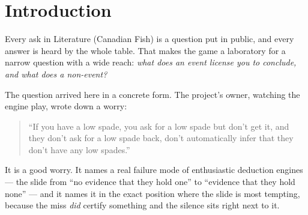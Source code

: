 \documentclass[11pt]{article}
\begin{document}
\begin{abstract}
none is on a difference between arms, and the smaller gap the reading rests on
($0.350$ sets) is under these arms' own $0.42$--$0.47$ detection floor. The arms do share
one bank and one baseline, so the comparison is paired and sharper than a between-bank one
would be --- but the paired interval was not computed, and at this $N$ the ordering is
reported as a signal to re-measure rather than as a settled result. Only a common-baseline
design raises the question at all --- measured each against its own baseline the
calibration fix reads as a flat $+0.04 \pm 0.41$. The same $400$-pair scale is where this instrument is weakest, and the
paper reports that in the body: the defusal quantity measures $+1.62$/$+1.66$ at
$4{,}000$ pairs, and the first explanation offered for the gap was tested and refuted.
A separate observation --- that two or three sets get ``ask-traded'' --- is confirmed at
$88.1\%$ against a $21.4\%$ availability-matched control and then shown not to be
reciprocation at all: $99.1\%$ of those replies are the hit-probability argmax. The
recommendation is to ship neither change.
\end{abstract}

\section{Introduction}
\label{sec:intro}

Every ask in Literature (Canadian Fish) is a question put in public, and every answer is
heard by the whole table. That makes the game a laboratory for a narrow question with a
wide reach: \emph{what does an event license you to conclude, and what does a
non-event?}

The question arrived here in a concrete form. The project's owner, watching the engine
play, wrote down a worry:

\begin{quote}
``If you have a low spade, you ask for a low spade but don't get it, and they don't ask
for a low spade back, don't automatically infer that they don't have any low spades.''
\end{quote}

It is a good worry. It names a real failure mode of enthusiastic deduction engines --- the
slide from ``no evidence that they hold one'' to ``evidence that they hold none'' --- and
it names it in the exact position where the slide is most tempting, because the miss
\emph{did} certify something and the silence sits right next to it.
\end{document}
